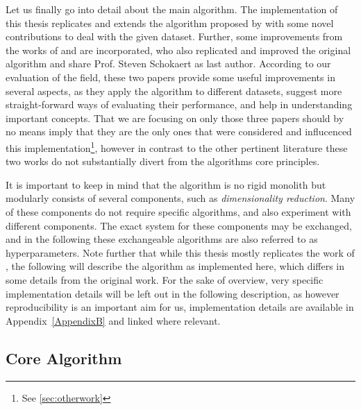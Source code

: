 Let us finally go into detail about the main algorithm. The implementation of this thesis replicates and extends the algorithm proposed by \textcite{Derrac2015} with some novel contributions to deal with the given dataset. Further, some improvements from the works of \textcite{Ager2018} and \textcite{Alshaikh2020} are incorporated, who also replicated and improved the original algorithm and share Prof. Steven Schokaert as last author. According to our evaluation of the field, these two papers provide some useful improvements in several aspects, as they apply the algorithm to different datasets, suggest more straight-forward ways of evaluating their performance, and help in understanding important concepts. That we are focusing on only those three papers should by no means imply that they are the only ones that were considered and influcenced this implementation\footnote{See \autoref{sec:otherwork}}, however in contrast to the other pertinent literature these two works do not substantially divert from the algorithms core principles.

It is important to keep in mind that the algorithm is no rigid monolith but modularly consists of several components, such as \textit{dimensionality reduction}. Many of these components do not require specific algorithms, and \mainalgos also experiment with different components. The exact system for these components may be exchanged, and in the following these exchangeable algorithms are also referred to as hyperparameters. Note further that while this thesis mostly replicates the work of \textcite{Derrac2015}, the following will describe the algorithm as implemented here, which differs in some details from the original work. For the sake of overview, very specific implementation details will be left out in the following description, as however reproducibility is an important aim for us, implementation details are available in Appendix~\ref{AppendixB} and linked where relevant. 

\subsection*{Core Algorithm}

